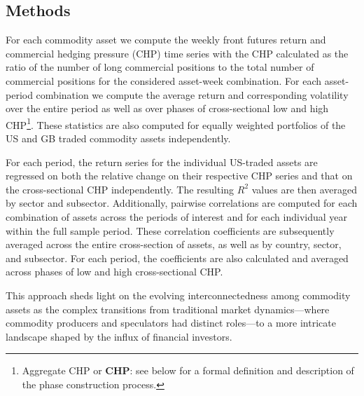 \documentclass[
  authoryear,
  preprint,
  3p]{elsarticle}
\begin{document}
\subsection{Methods}\label{sec-methods}

For each commodity asset we compute the weekly front futures return and
commercial hedging pressure (CHP) time series with the CHP calculated as
the ratio of the number of long commercial positions to the total number
of commercial positions for the considered asset-week combination. For
each asset-period combination we compute the average return and
corresponding volatility over the entire period as well as over phases
of cross-sectional low and high CHP\footnote{Aggregate CHP or
  \textbf{CHP}: see below for a formal definition and description of the
  phase construction process.}. These statistics are also computed for
equally weighted portfolios of the US and GB traded commodity assets
independently.

For each period, the return series for the individual US-traded assets
are regressed on both the relative change on their respective CHP series
and that on the cross-sectional CHP independently. The resulting
\(R^{2}\) values are then averaged by sector and subsector.
Additionally, pairwise correlations are computed for each combination of
assets across the periods of interest and for each individual year
within the full sample period. These correlation coefficients are
subsequently averaged across the entire cross-section of assets, as well
as by country, sector, and subsector. For each period, the coefficients
are also calculated and averaged across phases of low and high
cross-sectional CHP.

This approach sheds light on the evolving interconnectedness among
commodity assets as the complex transitions from traditional market
dynamics---where commodity producers and speculators had distinct
roles---to a more intricate landscape shaped by the influx of financial
investors.

\bigskip
\bigskip
\end{document}
